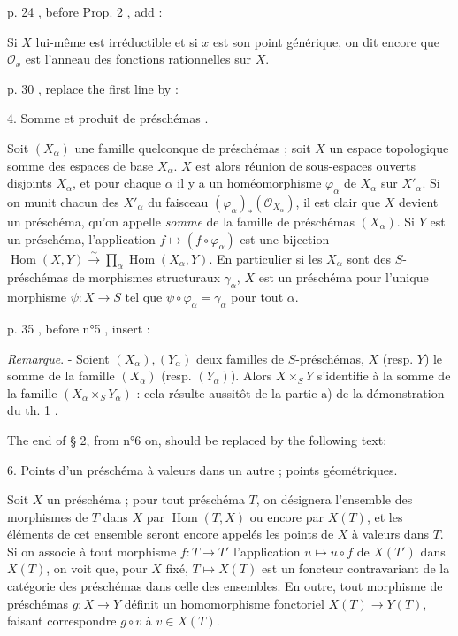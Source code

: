 \newpage



p. 24 , before Prop. 2 , add :

Si $X$ lui-même est irréductible et si $x$ est son point générique, on dit encore que $\mathcal{O}_x$ est l'anneau des fonctions rationnelles sur $X$.

p. 30 , replace the first line by :

4. Somme et produit de préschémas .

Soit $(X_{\alpha})$ une famille quelconque de préschémas ; soit $X$ un espace topologique somme des espaces de base $X_{\alpha}$. $X$ est alors réunion de sous-espaces ouverts disjoints $X_{\alpha}$, et pour chaque $\alpha$ il y a un homéomorphisme $\varphi_{\alpha}$ de $X_{\alpha}$ sur $X'_{\alpha}$. Si on munit chacun des $X'_{\alpha}$ du faisceau $(\varphi_{\alpha})_*(\mathcal{O}_{X_{\alpha}})$, il est clair que $X$ devient un préschéma, qu'on appelle \emph{somme} de la famille de préschémas $(X_{\alpha})$. Si $Y$ est un préschéma, l'application $f \mapsto (f \circ \varphi_{\alpha})$ est une bijection $\operatorname{Hom}(X, Y) \xrightarrow{\sim} \prod_{\alpha} \operatorname{Hom}(X_{\alpha}, Y)$. En particulier si les $X_{\alpha}$ sont des $S$-préschémas de morphismes structuraux $\gamma_{\alpha}$, $X$ est un préschéma pour l'unique morphisme $\psi : X \to S$ tel que $\psi \circ \varphi_{\alpha} = \gamma_{\alpha}$ pour tout $\alpha$.

p. 35 , before n°5 , insert :

\emph{Remarque}. - Soient $(X_{\alpha}), (Y_{\alpha})$ deux familles de $S$-préschémas, $X$ (resp. $Y$) le somme de la famille $(X_{\alpha})$ (resp. $(Y_{\alpha})$). Alors $X \times_S Y$ s'identifie à la somme de la famille $(X_{\alpha} \times_S Y_{\alpha})$ : cela résulte aussitôt de la partie a) de la démonstration du th. 1 .

\newpage



The end of § 2, from n°6 on, should be replaced by the following text:

6. Points d'un préschéma à valeurs dans un autre ; points géométriques.

Soit $X$ un préschéma ; pour tout préschéma $T$, on désignera l'ensemble des morphismes de $T$ dans $X$ par $\operatorname{Hom}(T,X)$ ou encore par $X(T)$, et les éléments de cet ensemble seront encore appelés les points de $X$ à valeurs dans $T$. Si on associe à tout morphisme $f : T \to T'$ l'application $u \mapsto u \circ f$ de $X(T')$ dans $X(T)$, on voit que, pour $X$ fixé, $T \mapsto X(T)$ est un foncteur contravariant de la catégorie des préschémas dans celle des ensembles. En outre, tout morphisme de préschémas $g : X \to Y$ définit un homomorphisme fonctoriel $X(T) \to Y(T)$, faisant correspondre $g \circ v$ à $v \in X(T)$.


